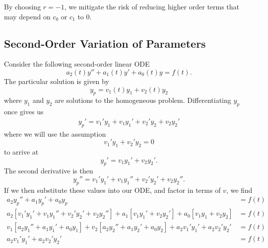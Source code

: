 \documentclass{article}
\begin{document}
By choosing \(r = -1\), we mitigate the risk of reducing higher order terms that may depend on \(c_0\) or \(c_1\) to 0.
\newpage
\begin{appendix}
    \section{Second-Order Variation of Parameters}
    Consider the following second-order linear ODE
    \begin{equation*}
        a_2\left( t \right) y'' + a_1\left( t \right) y' + a_0\left( t \right) y = f\left( t \right).
    \end{equation*}
    The particular solution is given by
    \begin{equation*}
        y_p = v_1 \left( t \right) y_1 + v_2\left( t \right) y_2
    \end{equation*}
    where \(y_1\) and \(y_2\) are solutions to the homogeneous problem.
    Differentiating \(y_p\) once gives us
    \begin{align*}
        y_p' = v_1' y_1 + v_1 y_1' + v_2' y_2 + v_2 y_2'
    \end{align*}
    where we will use the assumption
    \begin{equation*}
        v_1' y_1 + v_2' y_2 = 0
    \end{equation*}
    to arrive at
    \begin{equation*}
        y_p' = v_1 y_1' + v_2 y_2'.
    \end{equation*}
    The second derivative is then
    \begin{equation*}
        y_p'' = v_1' y_1' + v_1 y_1'' + v_2' y_2' + v_2 y_2''.
    \end{equation*}
    If we then substitute these values into our ODE, and factor in terms of \(v\), we find
    \begin{align*}
        a_2 y_p'' + a_1 y_p' + a_0 y_p                                                                                                                   & = f\left( t \right) \\
        a_2 \left[ v_1' y_1' + v_1 y_1'' + v_2' y_2' + v_2 y_2'' \right] + a_1 \left[ v_1 y_1' + v_2 y_2' \right] + a_0 \left[ v_1 y_1 + v_2 y_2 \right] & = f\left( t \right) \\
        v_1 \left[ a_2 y_1'' + a_1 y_1' + a_0 y_1 \right] + v_2 \left[ a_2 y_2'' + a_1 y_2' + a_0 y_2 \right] + a_2 v_1' y_1' + a_2 v_2' y_2'            & = f\left( t \right) \\
        a_2 v_1' y_1' + a_2 v_2' y_2'                                                                                                                    & = f\left( t \right) \\

\end{align*}
\end{appendix}
\end{document}
